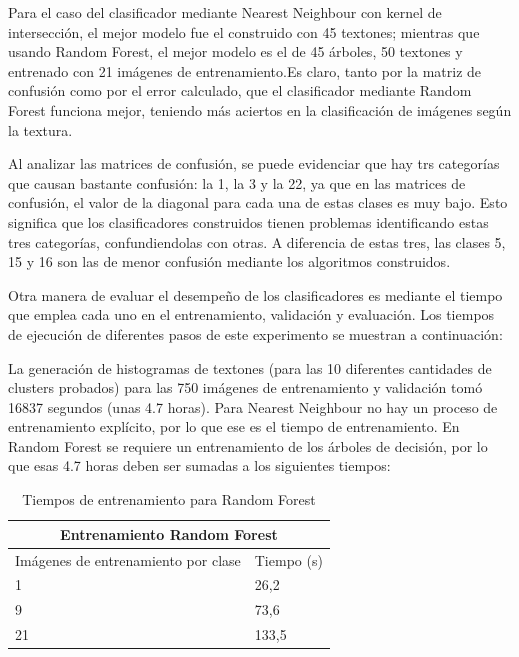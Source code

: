 \documentclass[10pt,twocolumn,letterpaper]{article}
\begin{document}
Para el caso del clasificador mediante Nearest Neighbour con kernel de intersección, el mejor modelo fue el construido con 45 textones; mientras que usando Random Forest, el mejor modelo es el de 45 árboles, 50 textones y entrenado con 21 imágenes de entrenamiento.Es claro, tanto por la matriz de confusión como por el error calculado, que el clasificador mediante Random Forest funciona mejor, teniendo más aciertos en la clasificación de imágenes según la textura. 

Al analizar las matrices de confusión, se puede evidenciar que hay trs categorías que causan bastante confusión: la 1, la 3 y la 22, ya que en las matrices de confusión, el valor de la diagonal para cada una de estas clases es muy bajo. Esto significa que los clasificadores construidos tienen problemas identificando estas tres categorías, confundiendolas con otras. A diferencia de estas tres, las clases 5, 15 y 16 son las de menor confusión mediante los algoritmos construidos.

Otra manera de evaluar el desempeño de los clasificadores es mediante el tiempo que emplea cada uno en el entrenamiento, validación y evaluación. Los tiempos de ejecución de diferentes pasos de este experimento se muestran a continuación:

La generación de histogramas de textones (para las 10 diferentes cantidades de clusters probados) para las 750 imágenes de entrenamiento y validación tomó 16837 segundos (unas 4.7 horas). Para Nearest Neighbour no hay un proceso de entrenamiento explícito, por lo que ese es el tiempo de entrenamiento. En Random Forest se requiere un entrenamiento de los árboles de decisión, por lo que esas 4.7 horas deben ser sumadas a los siguientes tiempos:

\begin{table}[h]
\centering
\begin{tabular}{ll}
\multicolumn{2}{c}{Entrenamiento Random Forest} \\ \hline
\multicolumn{1}{|l|}{Imágenes de entrenamiento por clase} & \multicolumn{1}{l|}{Tiempo (s)} \\ \hline
\multicolumn{1}{|l|}{1} & \multicolumn{1}{l|}{26,2} \\ \hline
\multicolumn{1}{|l|}{9} & \multicolumn{1}{l|}{73,6} \\ \hline
\multicolumn{1}{|l|}{21} & \multicolumn{1}{l|}{133,5} \\ \hline
\end{tabular}
\caption{Tiempos de entrenamiento para Random Forest}
\label{table: tiemposEntrenamientoRF}
\end{table}
\end{document}
